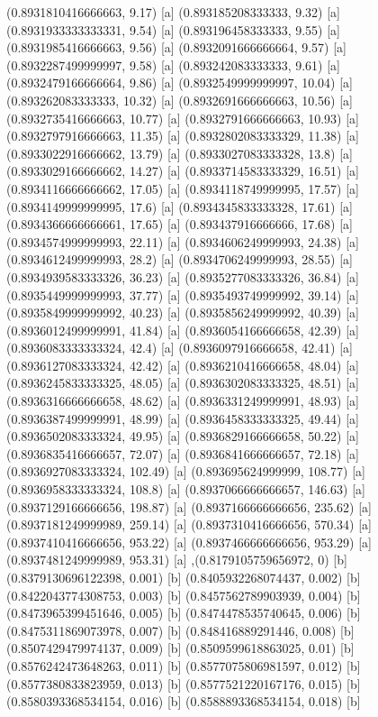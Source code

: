 {{{(0.8931810416666663, 9.17) [a] 
(0.893185208333333, 9.32) [a] 
(0.8931933333333331, 9.54) [a] 
(0.893196458333333, 9.55) [a] 
(0.8931985416666663, 9.56) [a] 
(0.8932091666666664, 9.57) [a] 
(0.8932287499999997, 9.58) [a] 
(0.893242083333333, 9.61) [a] 
(0.8932479166666664, 9.86) [a] 
(0.8932549999999997, 10.04) [a] 
(0.893262083333333, 10.32) [a] 
(0.8932691666666663, 10.56) [a] 
(0.8932735416666663, 10.77) [a] 
(0.8932791666666663, 10.93) [a] 
(0.8932797916666663, 11.35) [a] 
(0.8932802083333329, 11.38) [a] 
(0.8933022916666662, 13.79) [a] 
(0.8933027083333328, 13.8) [a] 
(0.8933029166666662, 14.27) [a] 
(0.8933714583333329, 16.51) [a] 
(0.8934116666666662, 17.05) [a] 
(0.8934118749999995, 17.57) [a] 
(0.8934149999999995, 17.6) [a] 
(0.8934345833333328, 17.61) [a] 
(0.8934366666666661, 17.65) [a] 
(0.893437916666666, 17.68) [a] 
(0.8934574999999993, 22.11) [a] 
(0.8934606249999993, 24.38) [a] 
(0.8934612499999993, 28.2) [a] 
(0.8934706249999993, 28.55) [a] 
(0.8934939583333326, 36.23) [a] 
(0.8935277083333326, 36.84) [a] 
(0.8935449999999993, 37.77) [a] 
(0.8935493749999992, 39.14) [a] 
(0.8935849999999992, 40.23) [a] 
(0.8935856249999992, 40.39) [a] 
(0.8936012499999991, 41.84) [a] 
(0.8936054166666658, 42.39) [a] 
(0.8936083333333324, 42.4) [a] 
(0.8936097916666658, 42.41) [a] 
(0.8936127083333324, 42.42) [a] 
(0.8936210416666658, 48.04) [a] 
(0.8936245833333325, 48.05) [a] 
(0.8936302083333325, 48.51) [a] 
(0.8936316666666658, 48.62) [a] 
(0.8936331249999991, 48.93) [a] 
(0.8936387499999991, 48.99) [a] 
(0.8936458333333325, 49.44) [a] 
(0.8936502083333324, 49.95) [a] 
(0.8936829166666658, 50.22) [a] 
(0.8936835416666657, 72.07) [a] 
(0.8936841666666657, 72.18) [a] 
(0.8936927083333324, 102.49) [a] 
(0.893695624999999, 108.77) [a] 
(0.8936958333333324, 108.8) [a] 
(0.8937066666666657, 146.63) [a] 
(0.8937129166666656, 198.87) [a] 
(0.8937166666666656, 235.62) [a] 
(0.8937181249999989, 259.14) [a] 
(0.8937310416666656, 570.34) [a] 
(0.8937410416666656, 953.22) [a] 
(0.8937466666666656, 953.29) [a] 
(0.8937481249999989, 953.31) [a] 
},{(0.8179105759656972, 0) [b] 
(0.8379130696122398, 0.001) [b] 
(0.8405932268074437, 0.002) [b] 
(0.8422043774308753, 0.003) [b] 
(0.8457562789903939, 0.004) [b] 
(0.8473965399451646, 0.005) [b] 
(0.8474478535740645, 0.006) [b] 
(0.8475311869073978, 0.007) [b] 
(0.848416889291446, 0.008) [b] 
(0.8507429479974137, 0.009) [b] 
(0.8509599618863025, 0.01) [b] 
(0.8576242473648263, 0.011) [b] 
(0.8577075806981597, 0.012) [b] 
(0.8577380833823959, 0.013) [b] 
(0.8577521220167176, 0.015) [b] 
(0.8580393368534154, 0.016) [b] 
(0.8588893368534154, 0.018) [b] 
}}}
